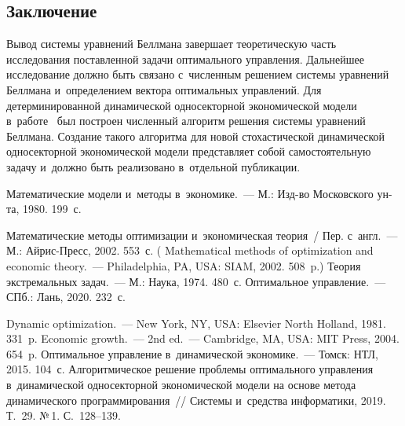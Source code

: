 \begin{multicols}{2}
\vspace*{-10pt}

\section{Заключение}

\vspace*{-2pt}

     Вывод системы уравнений Беллмана завершает теоретическую часть 
исследования поставленной задачи оптимального управления. Дальнейшее 
исследование должно быть связано с~численным решением системы уравнений 
Беллмана и~определением вектора оптимальных управлений. Для 
детерминированной динамической односекторной экономической модели 
в~работе~\cite{8-sh} был построен численный алгоритм решения системы 
уравнений Беллмана. Создание такого алгоритма для новой стохастической 
динамической односекторной экономической модели представляет собой 
самостоятельную задачу и~должно быть реализовано в~отдельной публикации.

\vspace*{-4pt}

{\small\frenchspacing
 {%
 \begin{thebibliography}{99}
 
 \vspace*{-2pt}


 Математические модели и~методы в~экономике.~--- М.: Изд-во Московского
 ун-та, 1980. 199~с. 
 
 Математические методы оптимизации и~экономическая теория~/ Пер. 
с~англ.~--- М.: Айрис-Пресс, 2002. 553~с. ( Mathematical methods of optimization 
and economic theory.~--- Philadelphia, PA, USA: SIAM, 2002. 508~p.)
 Теория экстремальных задач.~--- М.: Наука, 1974. 480~с.
 Оптимальное управление.~--- СПб.: Лань, 2020. 232~с.

\pagebreak

 Dynamic optimization.~--- New York, NY, USA: Elsevier North Holland, 
1981. 331~p.
 Economic growth.~--- 2nd ed.~--- Cambridge, MA, USA: MIT Press, 
2004. 654~p.
 Оптимальное управление в~динамической экономике.~--- Томск: НТЛ, 2015. 
104~с.
 Алгоритмическое решение проблемы оптимального управления 
в~динамической односекторной экономической модели на основе метода динамического 
программирования~// Системы и~средства информатики, 2019. Т.~29. №\,1. С.~128--139.


\end{thebibliography}}}
\end{multicols}
